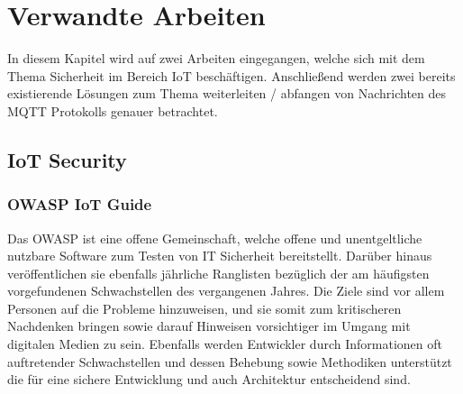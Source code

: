 \chapter{Verwandte Arbeiten}
In diesem Kapitel wird auf zwei Arbeiten eingegangen, welche sich mit dem Thema Sicherheit im Bereich \ac{IoT} beschäftigen. Anschließend werden zwei bereits existierende Lösungen zum Thema weiterleiten / abfangen von Nachrichten des \ac{MQTT} Protokolls genauer betrachtet.

\section{IoT Security}
    \subsection{OWASP IoT Guide}
    Das \ac{OWASP} ist eine offene Gemeinschaft, welche offene und unentgeltliche nutzbare Software zum Testen von IT Sicherheit bereitstellt. Darüber hinaus veröffentlichen sie ebenfalls jährliche Ranglisten bezüglich der am häufigsten vorgefundenen Schwachstellen des vergangenen Jahres. Die Ziele sind vor allem Personen auf die Probleme hinzuweisen, und sie somit zum kritischeren Nachdenken bringen sowie darauf Hinweisen vorsichtiger im Umgang mit digitalen Medien zu sein. Ebenfalls werden Entwickler durch Informationen oft auftretender Schwachstellen und dessen Behebung sowie Methodiken unterstützt die für eine sichere Entwicklung und auch Architektur entscheidend sind.
    

